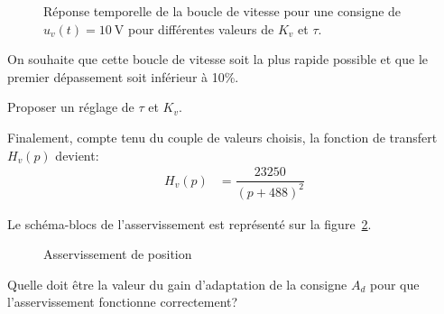 \begin{Exo}[name={Devoir},title={Système de pendulation},origin={Adapté de Centrale MP 2000},label={exo:CentralePendulation}]
\begin{figure}[H]
{
}
\caption{Réponse temporelle de la boucle de vitesse pour une consigne de $u_v(t)=\SI{10}{\volt}$  pour différentes valeurs de $K_v$  et $\tau$.}
\label{fig:trainPendulaire-reptemp}
\end{figure}

On souhaite que cette boucle de vitesse soit la plus rapide possible et que le premier dépassement soit inférieur à 10\%.

\qst Proposer un réglage de $\tau$   et $K_v$.

\Acompleter[8]


Finalement, compte tenu du couple de valeurs choisis, la fonction de transfert $H_v(p)$ devient:
\begin{align*}
H_v(p)&=\dfrac{23250}{(p+488)^2}
\end{align*}

Le schéma-blocs de l'asservissement est représenté sur la figure~\ref{fig:trainPendulaire-4}.






\begin{figure}[H]
\centering
{
\par
}


\caption{Asservissement de  position}
\label{fig:trainPendulaire-4}
\end{figure}

\qst Quelle doit être la valeur du gain d'adaptation de la consigne $A_d$  pour que l'asservissement fonctionne correctement?


\end{Exo}
